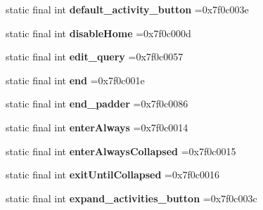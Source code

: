 \begin{DoxyCompactItemize}
\item 
\hypertarget{classcheck_1_1test_1_1_r_1_1id_a1bb8a6d10462bb8b480ecae0daaecf42}{}static final int {\bfseries default\+\_\+activity\+\_\+button} =0x7f0c003e\label{classcheck_1_1test_1_1_r_1_1id_a1bb8a6d10462bb8b480ecae0daaecf42}

\item 
\hypertarget{classcheck_1_1test_1_1_r_1_1id_ab50c2a91addaa029c0579e53760b67a5}{}static final int {\bfseries disable\+Home} =0x7f0c000d\label{classcheck_1_1test_1_1_r_1_1id_ab50c2a91addaa029c0579e53760b67a5}

\item 
\hypertarget{classcheck_1_1test_1_1_r_1_1id_a9fbb5ad4e727c4f633d2e183defc3359}{}static final int {\bfseries edit\+\_\+query} =0x7f0c0057\label{classcheck_1_1test_1_1_r_1_1id_a9fbb5ad4e727c4f633d2e183defc3359}

\item 
\hypertarget{classcheck_1_1test_1_1_r_1_1id_abfc4b0b9cd4751b496aceb9904caee68}{}static final int {\bfseries end} =0x7f0c001e\label{classcheck_1_1test_1_1_r_1_1id_abfc4b0b9cd4751b496aceb9904caee68}

\item 
\hypertarget{classcheck_1_1test_1_1_r_1_1id_ae946cc108188720a8bc849af2b483d25}{}static final int {\bfseries end\+\_\+padder} =0x7f0c0086\label{classcheck_1_1test_1_1_r_1_1id_ae946cc108188720a8bc849af2b483d25}

\item 
\hypertarget{classcheck_1_1test_1_1_r_1_1id_a7b8dfe43f42c720509349134a7ceb2c0}{}static final int {\bfseries enter\+Always} =0x7f0c0014\label{classcheck_1_1test_1_1_r_1_1id_a7b8dfe43f42c720509349134a7ceb2c0}

\item 
\hypertarget{classcheck_1_1test_1_1_r_1_1id_af0598791be6ca0268c2a3322de86f09e}{}static final int {\bfseries enter\+Always\+Collapsed} =0x7f0c0015\label{classcheck_1_1test_1_1_r_1_1id_af0598791be6ca0268c2a3322de86f09e}

\item 
\hypertarget{classcheck_1_1test_1_1_r_1_1id_a694a2671da85e78873748a9851579479}{}static final int {\bfseries exit\+Until\+Collapsed} =0x7f0c0016\label{classcheck_1_1test_1_1_r_1_1id_a694a2671da85e78873748a9851579479}

\item 
\hypertarget{classcheck_1_1test_1_1_r_1_1id_a0e0399d96462204df85a0d47cc0708bf}{}static final int {\bfseries expand\+\_\+activities\+\_\+button} =0x7f0c003c\label{classcheck_1_1test_1_1_r_1_1id_a0e0399d96462204df85a0d47cc0708bf}


\end{DoxyCompactItemize}
